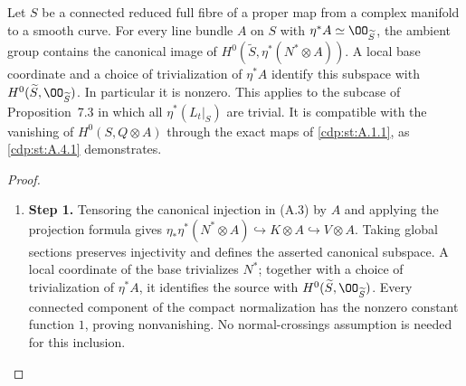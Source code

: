 \begin{proposition}\hypertarget{tag-01AZ}{}\label{cdp:st:A.5.1}

Let $S$ be a connected reduced full fibre of a proper map from a complex manifold to a smooth curve. For every line bundle $A$ on $S$ with $\eta^*A\simeq\OO_{\widetilde S}$, the ambient group contains the canonical image of $H^0(\widetilde S,\eta^*(N^*\otimes A))$. A local base coordinate and a choice of trivialization of $\eta^*A$ identify this subspace with $H^0(\widetilde S,\OO_{\widetilde S})$. In particular it is nonzero. This applies to the subcase of Proposition~7.3 in which all $\eta^*(L_t|_S)$ are trivial. It is compatible with the vanishing of $H^0(S,Q\otimes A)$ through the exact maps of \ref{cdp:st:A.1.1}, as \ref{cdp:st:A.4.1} demonstrates.
\end{proposition}


\begin{proof}
\begin{enumerate}[label={$\langle1\rangle$\arabic*.},leftmargin=*]
\item 
\noindent\textbf{Step 1.} Tensoring the canonical injection in (A.3) by $A$ and applying the projection formula gives
$\eta_*\eta^*(N^*\otimes A)\hookrightarrow K\otimes A\hookrightarrow V\otimes A$.
Taking global sections preserves injectivity and defines the asserted canonical subspace. A local coordinate of the base trivializes $N^*$; together with a choice of trivialization of $\eta^*A$, it identifies the source with $H^0(\widetilde S,\OO_{\widetilde S})$. Every connected component of the compact normalization has the nonzero constant function $1$, proving nonvanishing. No normal-crossings assumption is needed for this inclusion.

\end{enumerate}
\end{proof}